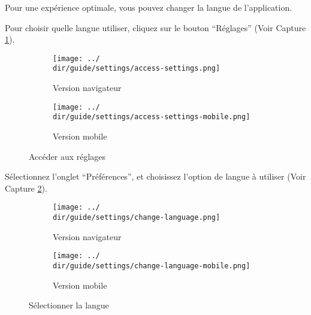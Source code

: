 Pour une expérience optimale, vous pouvez changer la langue de l’application.

Pour choisir quelle langue utiliser, cliquez sur le bouton “Réglages” (Voir Capture \ref{fig:access-settings-lang}).

\begin{figure}[H]
	\begin{subfigure}[b]{0.7\textwidth}
		\texttt{[image: ../\\dir/guide/settings/access-settings.png]}
		\caption{Version navigateur}
	\end{subfigure}
	\begin{subfigure}[b]{0.25\textwidth}
		\texttt{[image: ../\\dir/guide/settings/access-settings-mobile.png]}
		\caption{Version mobile}
	\end{subfigure}
	\caption{Accéder aux réglages}
	\label{fig:access-settings-lang}
\end{figure}

Sélectionnez l’onglet “Préférences”, et choisissez l’option de langue à utiliser (Voir Capture \ref{fig:change-language}).

\begin{figure}[H]
	\begin{subfigure}[b]{0.7\textwidth}
		\texttt{[image: ../\\dir/guide/settings/change-language.png]}
		\caption{Version navigateur}
	\end{subfigure}
	\begin{subfigure}[b]{0.25\textwidth}
		\texttt{[image: ../\\dir/guide/settings/change-language-mobile.png]}
		\caption{Version mobile}
	\end{subfigure}
	\caption{Sélectionner la langue}
	\label{fig:change-language}
\end{figure}
